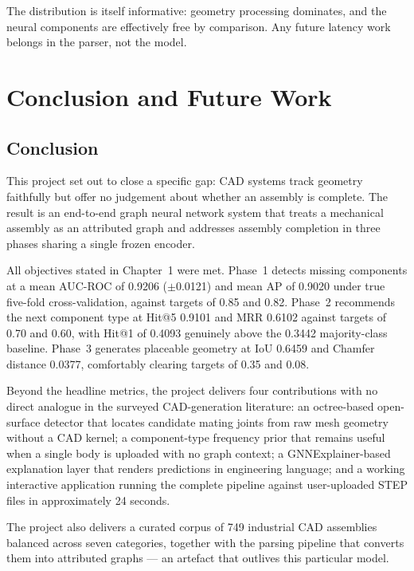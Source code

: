 \documentclass[12pt,oneside,a4paper]{report}
\begin{document}
The distribution is itself informative: geometry processing dominates, and the
neural components are effectively free by comparison. Any future latency work
belongs in the parser, not the model.

\chapter{Conclusion and Future Work}

\section{Conclusion}

This project set out to close a specific gap: CAD systems track geometry
faithfully but offer no judgement about whether an assembly is complete. The
result is an end-to-end graph neural network system that treats a mechanical
assembly as an attributed graph and addresses assembly completion in three
phases sharing a single frozen encoder.

All objectives stated in Chapter~1 were met. Phase~1 detects missing
components at a mean AUC-ROC of 0.9206 ($\pm$0.0121) and mean AP of 0.9020
under true five-fold cross-validation, against targets of 0.85 and 0.82.
Phase~2 recommends the next component type at Hit@5 0.9101 and MRR 0.6102
against targets of 0.70 and 0.60, with Hit@1 of 0.4093 genuinely above the
0.3442 majority-class baseline. Phase~3 generates placeable geometry at IoU
0.6459 and Chamfer distance 0.0377, comfortably clearing targets of 0.35 and
0.08.

Beyond the headline metrics, the project delivers four contributions with no
direct analogue in the surveyed CAD-generation literature: an octree-based
open-surface detector that locates candidate mating joints from raw mesh
geometry without a CAD kernel; a component-type frequency prior that remains
useful when a single body is uploaded with no graph context; a
GNNExplainer-based explanation layer that renders predictions in engineering
language; and a working interactive application running the complete pipeline
against user-uploaded STEP files in approximately 24 seconds.

The project also delivers a curated corpus of 749 industrial CAD assemblies
balanced across seven categories, together with the parsing pipeline that
converts them into attributed graphs --- an artefact that outlives this
particular model.
\end{document}

